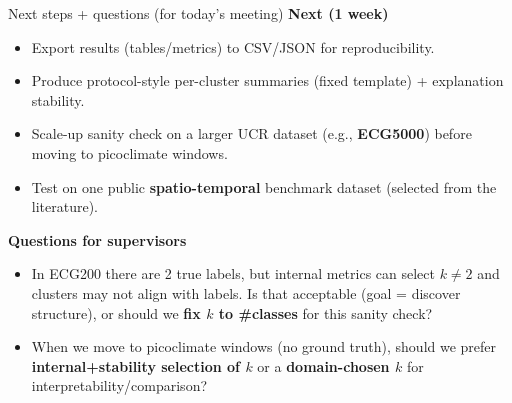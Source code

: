 \documentclass[aspectratio=169]{beamer}
\begin{document}
\begin{frame}{Next steps + questions (for today’s meeting)}
  \textbf{Next (1 week)}
  \begin{itemize}
    \item Export results (tables/metrics) to CSV/JSON for reproducibility.
    \item Produce protocol-style per-cluster summaries (fixed template) + explanation stability.
    \item Scale-up sanity check on a larger UCR dataset (e.g., \textbf{ECG5000}) before moving to picoclimate windows.
    \item Test on one public \textbf{spatio-temporal} benchmark dataset (selected from the literature).
  \end{itemize}

  \vspace{0.8em}
  \textbf{Questions for supervisors}
  \begin{itemize}
    \item In ECG200 there are 2 true labels, but internal metrics can select $k\neq 2$ and clusters may not align with labels. Is that acceptable (goal = discover structure), or should we \textbf{fix $k$ to \#classes} for this sanity check?
    \item When we move to picoclimate windows (no ground truth), should we prefer \textbf{internal+stability selection of $k$} or a \textbf{domain-chosen $k$} for interpretability/comparison?
  \end{itemize}
\end{frame}
\end{document}
